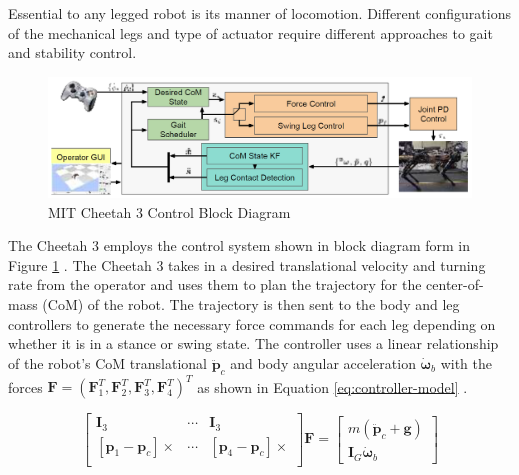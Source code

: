 \documentclass[english]{upeeei}
\begin{document}
Essential to any legged robot is its manner of locomotion. Different configurations of the mechanical legs and type of actuator require different approaches to gait and stability control. 

\begin{figure}[H]
\begin{centering}
\includegraphics[width=0.8\columnwidth]{images/cheetah3_control}
\par\end{centering}
\caption{MIT Cheetah 3 Control Block Diagram\label{fig:cheetah3-control}}
\end{figure}

The Cheetah 3 employs the control system shown in block diagram form in Figure \ref{fig:cheetah3-control} \cite{mitcheetah3}. The Cheetah 3 takes in a desired translational velocity and turning rate from the operator and uses them to plan the trajectory for the center-of-mass (CoM) of the robot. The trajectory is then sent to the body and leg controllers to generate the necessary force commands for each leg depending on whether it is in a stance or swing state. The controller uses a linear relationship of the robot's CoM translational $\ddot{\mathbf{p}}_c$ and body angular acceleration $\dot{\mathbf{\omega}}_b$ with the forces $\mathbf{F} = {(\mathbf{F}_1^T, \mathbf{F}_2^T, \mathbf{F}_3^T, \mathbf{F}_4^T)}^T$ as shown in Equation \ref{eq:controller-model} \cite{balancecontroller}.

\begin{equation}
    \label{eq:controller-model}
    \begin{bmatrix}
        \mathbf{I}_3 & \cdots & \mathbf{I}_3 \\
        [\mathbf{p}_1 - \mathbf{p}_c]\times & \cdots & [\mathbf{p}_4 - \mathbf{p}_c]\times \\
    \end{bmatrix}
    \mathbf{F}
    =
    \begin{bmatrix}
        m(\ddot{\mathbf{p}}_c + \mathbf{g}) \\
        \mathbf{I}_G \dot{\mathbf{\omega}}_b
    \end{bmatrix}
\end{equation}
\end{document}
